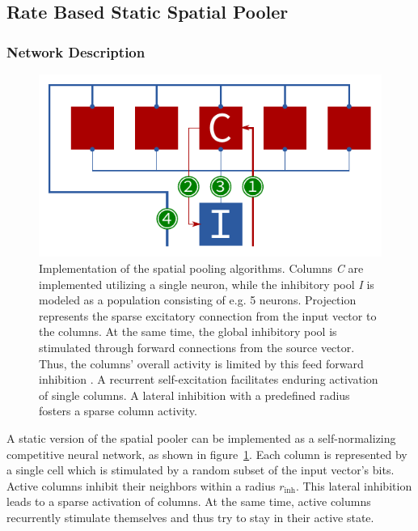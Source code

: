 \subsection{Rate Based Static Spatial Pooler}

\subsubsection{Network Description}

\begin{figure}
	\begin{center}
		\includegraphics{../circuitry/spatial_pooler.pdf}
	\end{center}
	\caption{Implementation of the spatial pooling algorithms. Columns \emph{C} are implemented utilizing a single neuron, while the inhibitory pool \emph{I} is modeled as a population consisting of e.g. 5 neurons. Projection \protect{} represents the sparse excitatory connection from the input vector to the columns. At the same time, the global inhibitory pool is stimulated through forward connections \protect{} from the source vector. Thus, the columns' overall activity is limited by this feed forward inhibition \protect{}. A recurrent self-excitation \protect{} facilitates enduring activation of single columns. A lateral inhibition with a predefined radius \protect{} fosters a sparse column activity.}
	\label{fig:static_spatial_pooler}
\end{figure}

A static version of the spatial pooler can be implemented as a self-normalizing competitive neural network, as shown in figure~\ref{fig:static_spatial_pooler}. Each column is represented by a single cell which is stimulated by a random subset of the input vector's bits. Active columns inhibit their neighbors within a radius $r_\text{inh}$. This lateral inhibition leads to a sparse activation of columns. At the same time, active columns recurrently stimulate themselves and thus try to stay in their active state.

